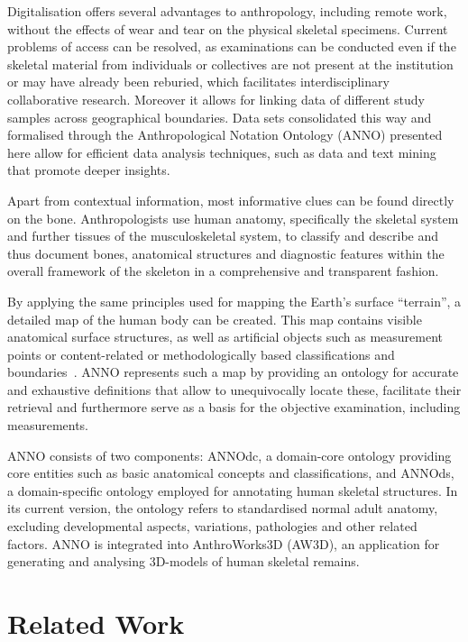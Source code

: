 \documentclass[sw]{iosart2x}
\begin{document}
Digitalisation offers several advantages to anthropology, including remote work, without the effects of wear and tear on the physical skeletal specimens.
Current problems of access can be resolved, as examinations can be conducted even if the skeletal material from individuals or collectives are not present at the institution or may have already been reburied, which facilitates interdisciplinary collaborative research.
Moreover it allows for linking data of different study samples across geographical boundaries.
Data sets consolidated this way and formalised through the Anthropological Notation Ontology (ANNO) presented here allow for efficient data analysis techniques, such as data and text mining that promote deeper insights.

Apart from contextual information, most informative clues can be found directly on the bone.
Anthropologists use human anatomy, specifically the skeletal system and further tissues of the musculoskeletal system, to classify and describe and thus document bones, anatomical structures and diagnostic features within the overall framework of the skeleton in a comprehensive and transparent fashion.

By applying the same principles used for mapping the Earth’s surface \enquote{terrain}, a detailed map of the human body can be created.
This map contains visible anatomical surface structures, as well as artificial objects such as measurement points or content-related or methodologically based classifications and boundaries~\citep{topo}.
ANNO represents such a map by providing an ontology for accurate and exhaustive definitions that allow to unequivocally locate these, facilitate their retrieval and furthermore serve as a basis for the objective examination, including measurements.

ANNO consists of two components: ANNOdc, a domain-core ontology providing core entities such as basic anatomical concepts and classifications, and ANNOds, a domain-specific ontology employed for annotating human skeletal structures. In its current version, the ontology refers to standardised normal adult anatomy, excluding developmental aspects, variations, pathologies and other related factors.
ANNO is integrated into AnthroWorks3D (AW3D), an application for generating and analysing 3D-models of human skeletal remains.


\section{Related Work}
\end{document}
